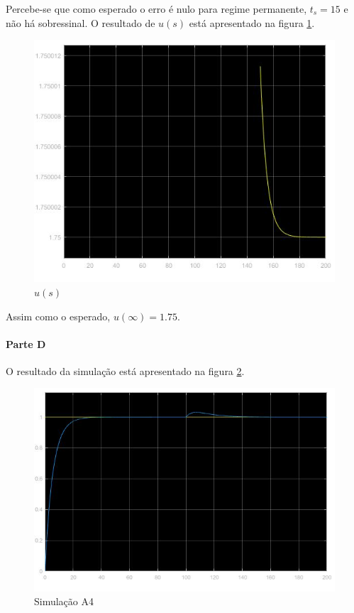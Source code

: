 \documentclass[
]{book}
\theoremstyle{definition}
\theoremstyle{definition}
\theoremstyle{definition}
\theoremstyle{remark}
\begin{document}
Percebe-se que como esperado o erro é nulo para regime permanente, \(t_s = 15\) e não há sobressinal. O resultado de \(u(s)\) está apresentado na figura \ref{fig:prob1C2}.

\begin{figure}

{\centering \includegraphics[width=0.8\linewidth]{Imagens/Lab5/Resolução/prob1C2} 

}

\caption{$u(s)$}\label{fig:prob1C2}
\end{figure}

Assim como o esperado, \(u(\infty) =1.75\).

\hypertarget{parte-d}{%
\paragraph*{Parte D}\label{parte-d}}

O resultado da simulação está apresentado na figura \ref{fig:prob1D1}.

\begin{figure}

{\centering \includegraphics[width=0.8\linewidth]{Imagens/Lab5/Resolução/prob1D1} 

}

\caption{Simulação A4}\label{fig:prob1D1}
\end{figure}
\end{document}
